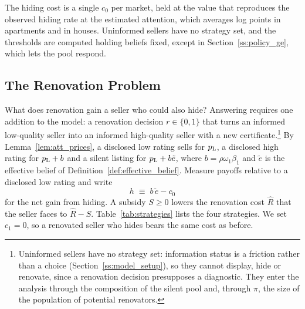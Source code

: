 \documentclass[10pt,letterpaper]{bp-template-concise}
\begin{document}
The hiding cost is a single $c_0$ per market, held at the value that reproduces the observed hiding rate at the estimated attention, which averages \attCzeroFitApt{} log points in apartments and \attCzeroFitHouse{} in houses. Uninformed sellers have no strategy set, and the thresholds are computed holding beliefs fixed, except in Section~\ref{ss:policy_ge}, which lets the pool respond.

\subsection{The Renovation Problem}
\label{ss:renov_problem}

What does renovation gain a seller who could also hide? Answering requires one addition to the model: a renovation decision $r\in\{0,1\}$ that turns an informed low-quality seller into an informed high-quality seller with a new certificate.\footnote{Uninformed sellers have no strategy set: information status is a friction rather than a choice (Section~\ref{ss:model_setup}), so they cannot display, hide or renovate, since a renovation decision presupposes a diagnostic. They enter the analysis through the composition of the silent pool and, through $\pi$, the size of the population of potential renovators.} By Lemma~\ref{lem:att_prices}, a disclosed low rating sells for $p_{\rm L}$, a disclosed high rating for $p_{\rm L}+b$ and a silent listing for $p_{\rm L}+b\tilde e$, where $b=\rho\omega_1\beta_1$ and $\tilde e$ is the effective belief of Definition~\ref{def:effective_belief}. Measure payoffs relative to a disclosed low rating and write
\[
    h\;\equiv\;b\,\tilde e-c_0
\]
for the net gain from hiding. A subsidy $S\ge0$ lowers the renovation cost $\hat R$ that the seller faces to $\hat R-S$. Table~\ref{tab:strategies} lists the four strategies. We set $c_1=0$, so a renovated seller who hides bears the same cost as before.
\end{document}
